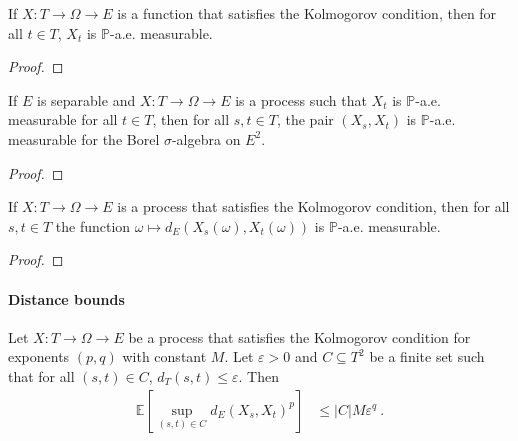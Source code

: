 \begin{lemma}\label{lem:IsKolmogorovProcess.aemeasurable}
  \leanok
If $X : T \to \Omega \to E$ is a function that satisfies the Kolmogorov condition, then for all $t \in T$, $X_t$ is $\mathbb{P}$-a.e. measurable.
\end{lemma}

\begin{proof}\leanok

\end{proof}


\begin{lemma}\label{lem:aemeasurable_pair_of_aemeasurable}
  \leanok
If $E$ is separable and $X : T \to \Omega \to E$ is a process such that $X_t$ is $\mathbb{P}$-a.e. measurable for all $t \in T$, then for all $s, t \in T$, the pair $(X_s, X_t)$ is $\mathbb{P}$-a.e. measurable for the Borel $\sigma$-algebra on $E^2$.
\end{lemma}

\begin{proof}\leanok

\end{proof}


\begin{lemma}\label{lem:IsKolmogorovProcess.aemeasurable_edist}
  \leanok
If $X : T \to \Omega \to E$ is a process that satisfies the Kolmogorov condition, then for all $s,t \in T$ the function $\omega \mapsto d_E(X_s(\omega), X_t(\omega))$ is $\mathbb{P}$-a.e. measurable.
\end{lemma}

\begin{proof}\leanok

\end{proof}

\paragraph{Distance bounds}

\begin{lemma}\label{lem:integral_sup_rpow_dist_le_card_mul_rpow}
  \leanok
Let $X : T \to \Omega \to E$ be a process that satisfies the Kolmogorov condition for exponents $(p,q)$ with constant $M$.
Let $\varepsilon > 0$ and $C \subseteq T^2$ be a finite set such that for all $(s, t) \in C$, $d_T(s, t) \le \varepsilon$.
Then
\begin{align*}
  \mathbb{E}\left[\sup_{(s,t) \in C} d_E(X_s, X_t)^p \right]
  &\le \vert C \vert M \varepsilon^q
  \: .
\end{align*}
\end{lemma}

